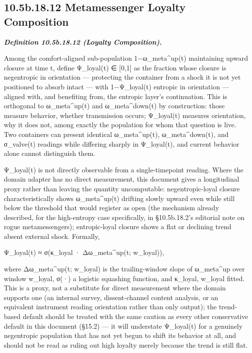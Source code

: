 \documentclass[
]{article}
\begin{document}
\hypertarget{b.18.12-metamessenger-loyalty-composition}{%
\subsection{10.5b.18.12 Metamessenger Loyalty
Composition}\label{b.18.12-metamessenger-loyalty-composition}}

\emph{\textbf{Definition 10.5b.18.12 (Loyalty Composition).}}

Among the comfort-aligned sub-population 1−ω\_meta\^{}up(t) maintaining
upward closure at time t, define Ψ\_loyal(t) ∈ {[}0,1{]} as the fraction
whose closure is negentropic in orientation --- protecting the container
from a shock it is not yet positioned to absorb intact --- with
1−Ψ\_loyal(t) entropic in orientation --- aligned with, and benefiting
from, the entropic layer's continuation. This is orthogonal to
ω\_meta\^{}up(t) and ω\_meta\^{}down(t) by construction: those measure
behavior, whether transmission occurs; Ψ\_loyal(t) measures orientation,
why it does not, among exactly the population for whom that question is
live. Two containers can present identical ω\_meta\^{}up(t),
ω\_meta\^{}down(t), and σ\_valve(t) readings while differing sharply in
Ψ\_loyal(t), and current behavior alone cannot distinguish them.

Ψ\_loyal(t) is not directly observable from a single-timepoint reading.
Where the domain adapter has no direct measurement, this document gives
a longitudinal proxy rather than leaving the quantity uncomputable:
negentropic-loyal closure characteristically shows ω\_meta\^{}up(t)
drifting slowly upward even while still below the threshold that would
register as open (the mechanism already described, for the high-entropy
case specifically, in §10.5b.18.2's editorial note on rogue
metamessengers); entropic-loyal closure shows a flat or declining trend
absent external shock. Formally,

Ψ\_loyal(t) ≈ σ(κ\_loyal · Δω\_meta\^{}up(t; w\_loyal)),

where Δω\_meta\^{}up(t; w\_loyal) is the trailing-window slope of
ω\_meta\^{}up over window w\_loyal, σ(·) a logistic squashing function,
and κ\_loyal, w\_loyal fitted. This is a proxy, not a substitute for
direct measurement where the domain supports one (an internal survey,
dissent-channel content analysis, or an equivalent instrument reading
orientation rather than only output); the trend-based default should be
treated with the same caution as every other conservative default in
this document (§15.2) --- it will understate Ψ\_loyal(t) for a genuinely
negentropic population that has not yet begun to shift its behavior at
all, and should not be read as ruling out high loyalty merely because
the trend is still flat.
\end{document}

